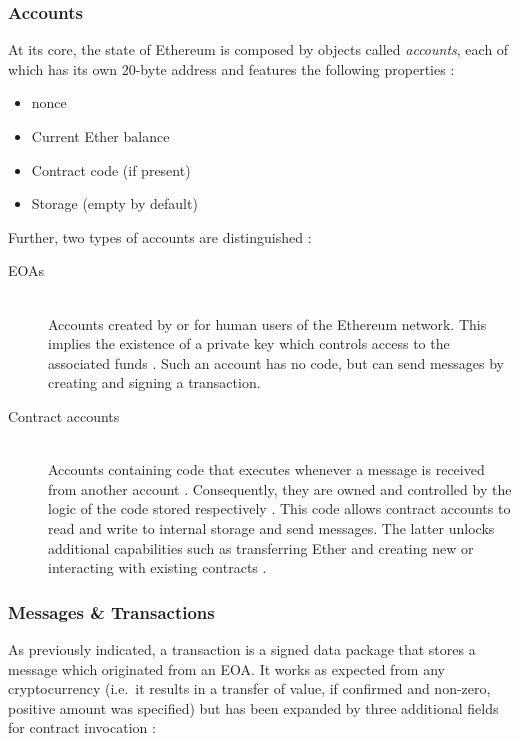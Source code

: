\subsubsection{Accounts}
\label{sec:accounts}
At its core, the state of Ethereum is composed by objects called \textit{accounts}, each of which has its own 20-byte address and features the following properties \cite[p.~17]{ethereumWhitepaperGitHub}: 

\begin{itemize}
  \item \Gls{nonce}
  \item Current Ether balance
  \item Contract code (if present)
  \item Storage (empty by default)
\end{itemize}

Further, two types of accounts are distinguished \cite[p.~17]{ethereumWhitepaperGitHub}:

\begin{description}
	\item[\acp{EOA}]
	\hfill \\
	Accounts created by or for human users of the Ethereum network. This implies the existence of a private key which controls access to the associated funds \cite[p.~13]{Antonopoulos.2018}. Such an account has no code, but can send messages by creating and signing a transaction.
	\item[Contract accounts]
	\hfill \\
	Accounts containing code that executes whenever a message is received from another account \cite[p.~13]{Antonopoulos.2018}. Consequently, they are owned and controlled by the logic of the code stored respectively \cite[p.~57]{Antonopoulos.2018}. This code allows contract accounts to read and write to internal storage and send messages. The latter unlocks additional capabilities such as transferring Ether and creating new or interacting with existing contracts \cite[p.~19]{ethereumWhitepaperGitHub}.
\end{description}

\subsubsection{Messages \& Transactions}
\label{sec:messagesTransactions}
As previously indicated, a transaction is a signed data package that stores a message which originated from an \ac{EOA}. It works as expected from any cryptocurrency (i.e.~it results in a transfer of value, if confirmed and non-zero, positive amount was specified) but has been expanded by three additional fields for contract invocation \cite[p.~18]{ethereumWhitepaperGitHub}: 

